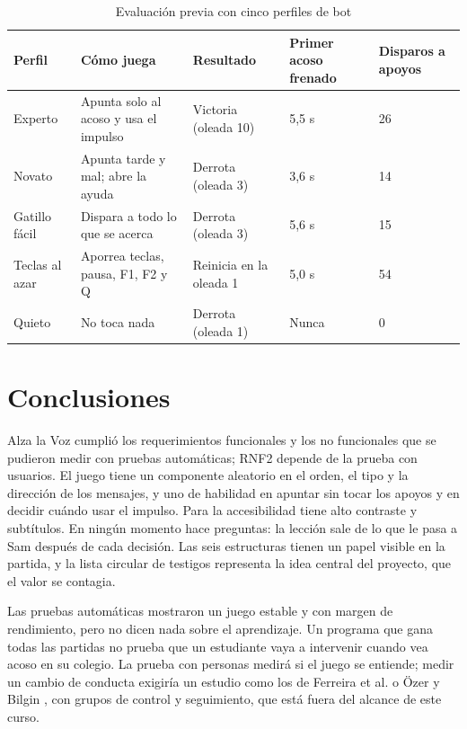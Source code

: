 \documentclass[conference]{IEEEtran}
\begin{document}
\begin{table}[!htbp]
\centering
\caption{Evaluación previa con cinco perfiles de bot}
\footnotesize
\begin{tabularx}{\textwidth}{|l|X|X|X|X|}
\hline
\textbf{Perfil} & \textbf{Cómo juega} & \textbf{Resultado} & \textbf{Primer acoso frenado} & \textbf{Disparos a apoyos} \\ \hline
Experto & Apunta solo al acoso y usa el impulso & Victoria (oleada 10) & 5,5 s & 26 \\ \hline
Novato & Apunta tarde y mal; abre la ayuda & Derrota (oleada 3) & 3,6 s & 14 \\ \hline
Gatillo fácil & Dispara a todo lo que se acerca & Derrota (oleada 3) & 5,6 s & 15 \\ \hline
Teclas al azar & Aporrea teclas, pausa, F1, F2 y Q & Reinicia en la oleada 1 & 5,0 s & 54 \\ \hline
Quieto & No toca nada & Derrota (oleada 1) & Nunca & 0 \\ \hline
\end{tabularx}
\end{table}

\section{Conclusiones}

Alza la Voz cumplió los requerimientos funcionales y los no funcionales que se pudieron medir con pruebas automáticas; RNF2 depende de la prueba con usuarios. El juego tiene un componente aleatorio en el orden, el tipo y la dirección de los mensajes, y uno de habilidad en apuntar sin tocar los apoyos y en decidir cuándo usar el impulso. Para la accesibilidad tiene alto contraste y subtítulos. En ningún momento hace preguntas: la lección sale de lo que le pasa a Sam después de cada decisión. Las seis estructuras tienen un papel visible en la partida, y la lista circular de testigos representa la idea central del proyecto, que el valor se contagia.

Las pruebas automáticas mostraron un juego estable y con margen de rendimiento, pero no dicen nada sobre el aprendizaje. Un programa que gana todas las partidas no prueba que un estudiante vaya a intervenir cuando vea acoso en su colegio. La prueba con personas medirá si el juego se entiende; medir un cambio de conducta exigiría un estudio como los de Ferreira et al. \cite{ref3} o Özer y Bilgin \cite{ref9}, con grupos de control y seguimiento, que está fuera del alcance de este curso.
\end{document}
